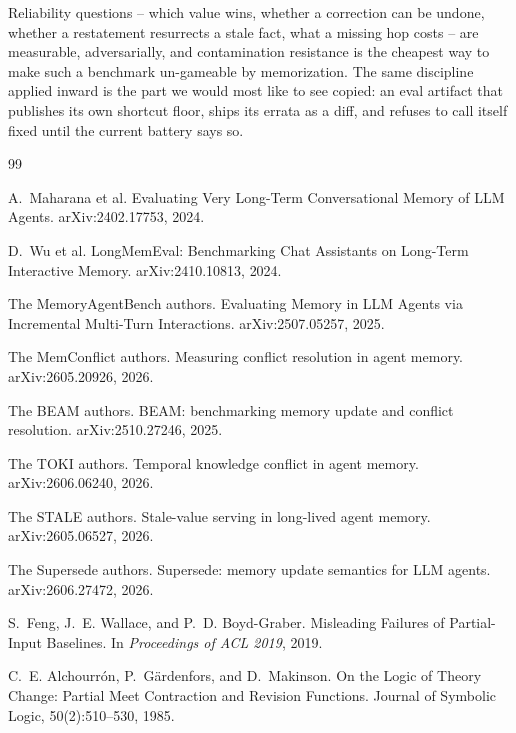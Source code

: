 \documentclass[11pt]{article}
\begin{document}
Reliability questions -- which value wins, whether a correction can be undone, whether a restatement
resurrects a stale fact, what a missing hop costs -- are measurable, adversarially, and contamination
resistance is the cheapest way to make such a benchmark un-gameable by memorization. The same
discipline applied inward is the part we would most like to see copied: an eval artifact that publishes
its own shortcut floor, ships its errata as a diff, and refuses to call itself fixed until the current
battery says so.


\begin{thebibliography}{99}

 A.~Maharana et al.
\newblock Evaluating Very Long-Term Conversational Memory of LLM Agents.
\newblock arXiv:2402.17753, 2024.

 D.~Wu et al.
\newblock LongMemEval: Benchmarking Chat Assistants on Long-Term Interactive Memory.
\newblock arXiv:2410.10813, 2024.

 The MemoryAgentBench authors.
\newblock Evaluating Memory in LLM Agents via Incremental Multi-Turn Interactions.
\newblock arXiv:2507.05257, 2025.

 The MemConflict authors.
\newblock Measuring conflict resolution in agent memory.
\newblock arXiv:2605.20926, 2026.

 The BEAM authors.
\newblock BEAM: benchmarking memory update and conflict resolution.
\newblock arXiv:2510.27246, 2025.

 The TOKI authors.
\newblock Temporal knowledge conflict in agent memory.
\newblock arXiv:2606.06240, 2026.

 The STALE authors.
\newblock Stale-value serving in long-lived agent memory.
\newblock arXiv:2605.06527, 2026.

 The Supersede authors.
\newblock Supersede: memory update semantics for LLM agents.
\newblock arXiv:2606.27472, 2026.

 S.~Feng, J.~E. Wallace, and P.~D. Boyd-Graber.
\newblock Misleading Failures of Partial-Input Baselines.
\newblock In \emph{Proceedings of ACL 2019}, 2019.

 C.~E. Alchourr\'on, P.~G\"ardenfors, and D.~Makinson.
\newblock On the Logic of Theory Change: Partial Meet Contraction and Revision Functions.
\newblock Journal of Symbolic Logic, 50(2):510--530, 1985.


\end{thebibliography}
\end{document}
